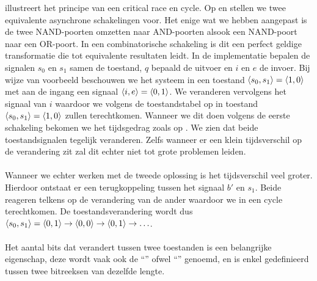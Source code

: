  illustreert het principe van een critical race en cycle. Op  en  stellen we twee equivalente asynchrone schakelingen voor. Het enige wat we hebben aangepast is de twee NAND-poorten omzetten naar AND-poorten alsook een NAND-poort naar een OR-poort. In een combinatorische schakeling is dit een perfect geldige transformatie die tot equivalente resultaten leidt. In de implementatie bepalen de signalen $s_0$ en $s_1$ samen de toestand, $q$ bepaald de uitvoer en $i$ en $e$ de invoer. Bij wijze van voorbeeld beschouwen we het systeem in een toestand $\left\langle s_0,s_1 \right\rangle=\left\langle 1,0 \right\rangle$ met aan de ingang een signaal $\left\langle i,e \right\rangle=\left\langle 0,1 \right\rangle$. We veranderen vervolgens het signaal van $i$ waardoor we volgens de toestandstabel op  in toestand $\left\langle s_0,s_1 \right\rangle=\left\langle 1,0 \right\rangle$ zullen terechtkomen. Wanneer we dit doen volgens de eerste schakeling bekomen we het tijdsgedrag zoals op . We zien dat beide toestandsignalen tegelijk veranderen. Zelfs wanneer er een klein tijdsverschil op de verandering zit zal dit echter niet tot grote problemen leiden.
\paragraph{}
Wanneer we echter werken met de tweede oplossing is het tijdsverschil veel groter. Hierdoor ontstaat er een terugkoppeling tussen het signaal $b'$ en $s_1$. Beide reageren telkens op de verandering van de ander waardoor we in een cycle terechtkomen. De toestandsverandering wordt dus $\left\langle s_0,s_1 \right\rangle=\left\langle 0,1 \right\rangle\rightarrow\left\langle 0,0 \right\rangle\rightarrow\left\langle 0,1 \right\rangle\rightarrow\ldots$.
\paragraph{}

\paragraph{}Het aantal bits dat verandert tussen twee toestanden is een belangrijke eigenschap, deze wordt vaak ook de ``'' ofwel ``'' genoemd, en is enkel gedefinieerd tussen twee bitreeksen van dezelfde lengte.
